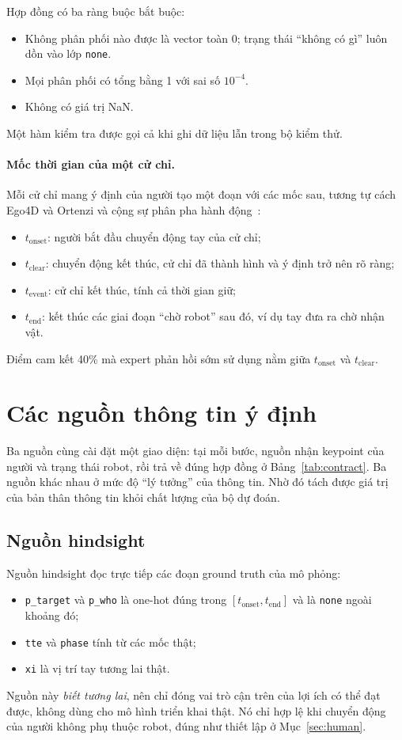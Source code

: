 Hợp đồng có ba ràng buộc bắt buộc:
\begin{itemize}
  \item Không phân phối nào được là vector toàn 0; trạng thái ``không có gì'' luôn dồn vào lớp \texttt{none}.
  \item Mọi phân phối có tổng bằng 1 với sai số $10^{-4}$.
  \item Không có giá trị NaN.
\end{itemize}
Một hàm kiểm tra được gọi cả khi ghi dữ liệu lẫn trong bộ kiểm thử.

\paragraph{Mốc thời gian của một cử chỉ.} Mỗi cử chỉ mang ý định của người tạo một đoạn với các mốc sau, tương tự cách Ego4D và Ortenzi và cộng sự phân pha hành động~\cite{grauman2022ego4d,ortenzi2021handovers}:
\begin{itemize}
  \item $t_\text{onset}$: người bắt đầu chuyển động tay của cử chỉ;
  \item $t_\text{clear}$: chuyển động kết thúc, cử chỉ đã thành hình và ý định trở nên rõ ràng;
  \item $t_\text{event}$: cử chỉ kết thúc, tính cả thời gian giữ;
  \item $t_\text{end}$: kết thúc các giai đoạn ``chờ robot'' sau đó, ví dụ tay đưa ra chờ nhận vật.
\end{itemize}
Điểm cam kết 40\% mà expert phản hồi sớm sử dụng nằm giữa $t_\text{onset}$ và $t_\text{clear}$.

\section{Các nguồn thông tin ý định}
\label{sec:sources}

Ba nguồn cùng cài đặt một giao diện: tại mỗi bước, nguồn nhận keypoint của người và trạng thái robot, rồi trả về đúng hợp đồng ở Bảng~\ref{tab:contract}. Ba nguồn khác nhau ở mức độ ``lý tưởng'' của thông tin. Nhờ đó tách được giá trị của bản thân thông tin khỏi chất lượng của bộ dự đoán.

\subsection{Nguồn hindsight}

Nguồn hindsight đọc trực tiếp các đoạn ground truth của mô phỏng:
\begin{itemize}
  \item \texttt{p\_target} và \texttt{p\_who} là one-hot đúng trong $[t_\text{onset}, t_\text{end}]$ và là \texttt{none} ngoài khoảng đó;
  \item \texttt{tte} và \texttt{phase} tính từ các mốc thật;
  \item \texttt{xi} là vị trí tay tương lai thật.
\end{itemize}
Nguồn này \emph{biết tương lai}, nên chỉ đóng vai trò cận trên của lợi ích có thể đạt được, không dùng cho mô hình triển khai thật. Nó chỉ hợp lệ khi chuyển động của người không phụ thuộc robot, đúng như thiết lập ở Mục~\ref{sec:human}.

